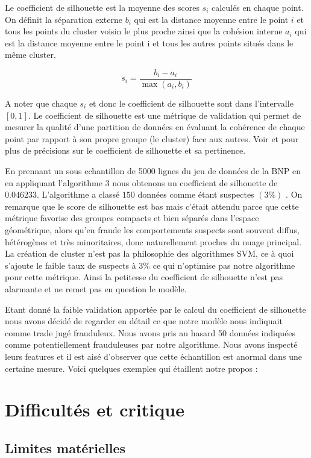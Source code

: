 \documentclass[a4paper]{article}
\begin{document}
Le coefficient de silhouette est la moyenne des scores $s_i$ calculés en chaque point. On définit la séparation externe $b_i$ qui est la distance moyenne entre le point $i$ et tous les points du cluster voisin le plus proche ainsi que la cohésion interne $a_i$ qui est la distance moyenne entre le point i et tous les autres points situés dans le même cluster. 

$$s_i = \frac{b_i - a_i}{\max(a_i, b_i)}$$

A noter que chaque $s_i$ et donc le coefficient de silhouette sont dans l'intervalle $[0, 1]$. Le coefficient de silhouette est une métrique de validation qui permet de mesurer la qualité d’une partition de données en évaluant la cohérence de chaque point par rapport à son propre groupe (le cluster) face aux autres. Voir \cite{Rousseeuw1987} et \cite{Shahapure2020} pour plus de précisions sur le coefficient de silhouette et sa pertinence. 

En prennant un sous echantillon de 5000 lignes du jeu de données de la BNP en en appliquant l'algorithme 3 nous obtenons un coefficient de silhouette de $0.046233$. L'algorithme a classé $150$ données comme étant suspectes $(3\%)$ . On remarque que le score de silhouette est bas mais c'était attendu parce que cette métrique favorise des groupes compacts et bien séparés dans l’espace géométrique, alors qu’en fraude les comportements suspects sont souvent diffus, hétérogènes et très minoritaires, donc naturellement proches du nuage principal. La création de cluster n'est pas la philosophie des algorithmes SVM, ce à quoi s'ajoute le faible taux de suspects à $3\%$ ce qui n'optimise pas notre algorithme pour cette métrique. Ainsi la petitesse du coefficient de silhouette n'est pas alarmante et ne remet pas en question le modèle.  


Etant donné la faible validation apportée par le calcul du coefficient de silhouette nous avons décidé de regarder en détail ce que notre modèle nous indiquait comme trade jugé frauduleux. Nous avons pris au hasard 50 données indiquées comme potentiellement frauduleuses par notre algorithme. Nous avons inspecté leurs features et il est aisé d'observer que cette échantillon est anormal dans une certaine mesure. Voici quelques exemples qui étaillent notre propos :

\section{Difficultés et critique}

\subsection{Limites matérielles}
\end{document}

